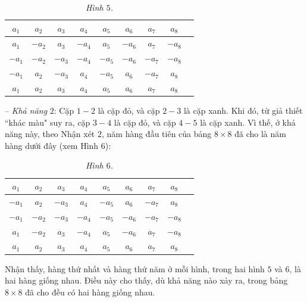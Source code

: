 \begin{multicols}{2}
\begin{table}[H]
		\centering
		\captionsetup{labelformat= empty, justification=centering}
		\begin{tabular}{|c|c|c|c|c|c|c|c|c|}
			\hline
			$a_1$ & $a_2$ & $a_3$ & $a_4$ & $a_5$ & $a_6$ & $a_7$ & $a_8$ \\
			\hline
			$a_1$ & $-a_2$ & $a_3$ & $-a_4$ & $a_5$ & $-a_6$ & $a_7$ & $-a_8$ \\
			\hline
			$-a_1$ & $-a_2$ & $-a_3$ & $-a_4$ & $-a_5$ & $-a_6$ & $-a_7$ & $-a_8$ \\
			\hline
			$-a_1$ & $a_2$ & $-a_3$ & $a_4$ & $-a_5$ & $a_6$ & $-a_7$ & $a_8$ \\
			\hline
			$a_1$ & $a_2$ & $a_3$ & $a_4$ & $a_5$ & $a_6$ & $a_7$ & $a_8$ \\
			\hline
		\end{tabular}
		\caption{\small\textit{\color{thachthuctoanhoc}Hình $5$.}}
		\vspace*{-10pt}
	\end{table}
	-- \textit{Khả năng} $2$: Cặp $1 - 2$ là cặp đỏ, và cặp $2 - 3$ là cặp xanh.
	\vskip 0.05cm
	Khi đó, từ giả thiết ``khác màu" suy ra, cặp $3 - 4$ là cặp đỏ, và cặp $4 - 5$ là cặp xanh.
	\vskip 0.05cm
	Vì thế, ở khả năng này, theo Nhận xét $2$, năm hàng đầu tiên của bảng $8 \times  8$ đã cho là năm hàng dưới đây (xem Hình $6$):
	\begin{table}[H]
		\vspace*{-5pt}
		\centering
		\captionsetup{labelformat= empty, justification=centering}
		\begin{tabular}{|c|c|c|c|c|c|c|c|c|}
			\hline
			$a_1$ & $a_2$ & $a_3$ & $a_4$ & $a_5$ & $a_6$ & $a_7$ & $a_8$ \\
			\hline
			$-a_1$ & $a_2$ & $-a_3$ & $a_4$ & $-a_5$ & $a_6$ & $-a_7$ & $a_8$ \\
			\hline
			$-a_1$ & $-a_2$ & $-a_3$ & $-a_4$ & $-a_5$ & $-a_6$ & $-a_7$ & $-a_8$ \\
			\hline
			$a_1$ & $-a_2$ & $a_3$ & $-a_4$ & $a_5$ & $-a_6$ & $a_7$ & $-a_8$ \\
			\hline
			$a_1$ & $a_2$ & $a_3$ & $a_4$ & $a_5$ & $a_6$ & $a_7$ & $a_8$ \\
			\hline
		\end{tabular}
		\caption{\small\textit{\color{thachthuctoanhoc}Hình $6$.}}
		\vspace*{-10pt}
	\end{table}
	Nhận thấy, hàng thứ nhất và hàng thứ năm ở mỗi hình, trong hai hình $5$ và $6$, là hai hàng giống nhau. Điều này cho thấy, dù khả năng nào xảy ra, trong bảng $8 \times  8$ đã cho đều có hai hàng giống nhau.

\end{multicols}
